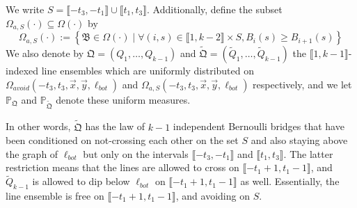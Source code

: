 \begin{definition}\label{TildeDef}
	We write $S = \llbracket -t_3,-t_1\rrbracket\cup \llbracket t_1,t_3\rrbracket$. Additionally, define the subset $\Omega_{a,S}(\cdot)\subseteq \Omega(\cdot)$ by 
	\begin{equation}\label{OmegaASDef}\Omega_{a,S}(\cdot):=\left\{\mathfrak{B} \in \Omega(\cdot)\mid  \forall (i,s)\in\llbracket 1,k-2\rrbracket\times S, B_{i}(s)\geq B_{i+1}(s)\right\}
	\end{equation} We also denote by $\mathfrak{Q} = (Q_1,\dots,Q_{k-1})$ and $\tilde{\mathfrak{Q}} = (\tilde{Q}_1, \dots, \tilde{Q}_{k-1})$ the $\llbracket 1, k-1 \rrbracket$-indexed line ensembles which are uniformly distributed on $\Omega_{avoid}(-t_3,t_3,\vec{x},\vec{y},\ell_{bot})$ and $\Omega_{a,S}(-t_3, t_3, \vec{x}, \vec{y}, \ell_{bot})$ respectively, and we let $\mathbb{P}_{\mathfrak{Q}}$ and $\mathbb{P}_{\tilde{\mathfrak{Q}}}$ denote these uniform measures.
\end{definition}
In other words, $\tilde{\mathfrak{Q}}$ has the law of $k-1$ independent Bernoulli bridges that have been conditioned on not-crossing each other on the set $S$ and also staying above the graph of $\ell_{bot}$ but only on the intervals $\llbracket-t_3, -t_1\rrbracket$ and $\llbracket t_1, t_3\rrbracket$. The latter restriction means that the lines are allowed to cross on $\llbracket -t_1+1,t_1-1\rrbracket$, and  $\tilde{Q}_{k-1}$ is allowed to dip below $\ell_{bot}$ on $\llbracket -t_1+1,t_1-1\rrbracket$ as well. Essentially, the line ensemble is free on $\llbracket -t_1+1,t_1-1\rrbracket$, and avoiding on $S$.

